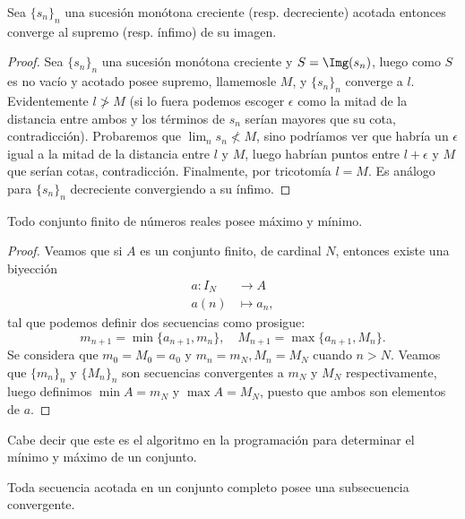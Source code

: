 \documentclass[11pt,oneside,a4paper]{book}
\begin{document}
\begin{thm}
Sea $\{s_n\}_n$ una sucesión monótona creciente (resp. decreciente) acotada entonces converge al supremo (resp. ínfimo) de su imagen.
\end{thm}
\begin{proof}
Sea $\{s_n\}_n$ una sucesión monótona creciente y $S=\Img(s_n)$, luego como $S$ es no vacío y acotado posee supremo, llamemosle $M$, y $\{s_n\}_n$ converge a $l$. Evidentemente $l\not\gt M$ (si lo fuera podemos escoger $\epsilon$ como la mitad de la distancia entre ambos y los términos de $s_n$ serían mayores que su cota, contradicción). Probaremos que $\lim_n s_n\not\lt M$, sino podríamos ver que habría un $\epsilon$ igual a la mitad de la distancia entre $l$ y $M$, luego habrían puntos entre $l+\epsilon$ y $M$ que serían cotas, contradicción. Finalmente, por tricotomía $l=M$. Es análogo para $\{s_n\}_n$ decreciente convergiendo a su ínfimo.
\end{proof}
\begin{thm}
Todo conjunto finito de números reales posee máximo y mínimo.
\end{thm}
\begin{proof}
Veamos que si $A$ es un conjunto finito, de cardinal $N$, entonces existe una biyección
\begin{align*}
a:I_N&\longrightarrow A\\
a(n)&\longmapsto a_n,
\end{align*}
tal que podemos definir dos secuencias como prosigue:
$$m_{n+1}=\min\{a_{n+1},m_n\},\quad M_{n+1}=\max\{a_{n+1},M_n\}.$$
Se considera que $m_0=M_0=a_0$ y $m_n=m_N,M_n=M_N$ cuando $n\gt N$. Veamos que $\{m_n\}_n$ y $\{M_n\}_n$ son secuencias convergentes a $m_N$ y $M_N$ respectivamente, luego definimos $\min A=m_N$ y $\max A=M_N$, puesto que ambos son elementos de $a$.
\end{proof}
Cabe decir que este es el algoritmo en la programación para determinar el mínimo y máximo de un conjunto.
\begin{thm}
Toda secuencia acotada en un conjunto completo posee una subsecuencia convergente.
\end{thm}
\end{document}
